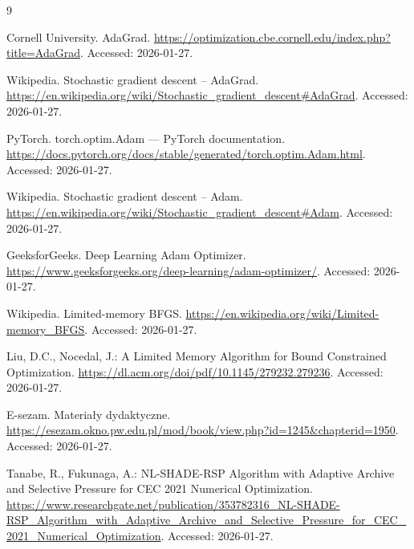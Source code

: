 \begin{thebibliography}{9}

Cornell University. AdaGrad. \url{https://optimization.cbe.cornell.edu/index.php?title=AdaGrad}. Accessed: 2026-01-27.

Wikipedia. Stochastic gradient descent -- AdaGrad. \url{https://en.wikipedia.org/wiki/Stochastic_gradient_descent\#AdaGrad}. Accessed: 2026-01-27.

PyTorch. torch.optim.Adam — PyTorch documentation. \url{https://docs.pytorch.org/docs/stable/generated/torch.optim.Adam.html}. Accessed: 2026-01-27.

Wikipedia. Stochastic gradient descent -- Adam. \url{https://en.wikipedia.org/wiki/Stochastic_gradient_descent\#Adam}. Accessed: 2026-01-27.

GeeksforGeeks. Deep Learning Adam Optimizer. \url{https://www.geeksforgeeks.org/deep-learning/adam-optimizer/}. Accessed: 2026-01-27.

Wikipedia. Limited-memory BFGS. \url{https://en.wikipedia.org/wiki/Limited-memory_BFGS}. Accessed: 2026-01-27.

Liu, D.C., Nocedal, J.: A Limited Memory Algorithm for Bound Constrained Optimization. \url{https://dl.acm.org/doi/pdf/10.1145/279232.279236}. Accessed: 2026-01-27.

E-sezam. Materiały dydaktyczne. \url{https://esezam.okno.pw.edu.pl/mod/book/view.php?id=1245&chapterid=1950}. Accessed: 2026-01-27.

Tanabe, R., Fukunaga, A.: NL-SHADE-RSP Algorithm with Adaptive Archive and Selective Pressure for CEC 2021 Numerical Optimization. \url{https://www.researchgate.net/publication/353782316_NL-SHADE-RSP_Algorithm_with_Adaptive_Archive_and_Selective_Pressure_for_CEC_2021_Numerical_Optimization}. Accessed: 2026-01-27.

\end{thebibliography}
